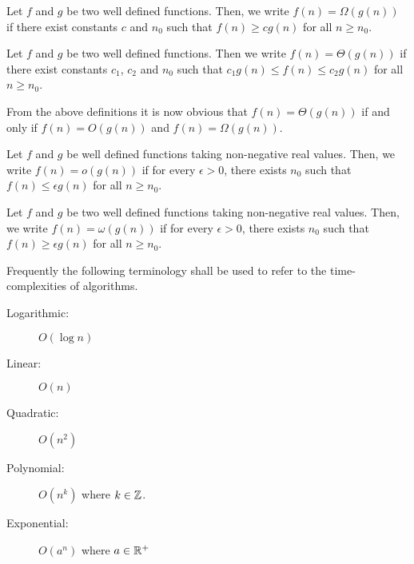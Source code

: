 	\begin{definition}
		Let $f$ and $g$ be two well defined functions. Then, we write $f(n) = \Omega(g(n))$ if there exist constants $c$ and $n_0$ such that $f(n)\ge cg(n)$ for all $n\ge n_0$.
	\end{definition}
	\begin{definition}
		Let $f$ and $g$ be two well defined functions. Then we write $f(n) = \Theta(g(n))$ if there exist constants $c_1$, $c_2$ and $n_0$ such that $c_1g(n)\le f(n)\le c_2g(n)$ for all $n\ge n_0$.
	\end{definition}
	From the above definitions it is now obvious that $f(n) = \Theta(g(n))$ if and only if $f(n) = O(g(n))$ and $f(n) = \Omega(g(n))$.

	\begin{definition}
		Let $f$ and $g$ be well defined functions taking non-negative real values. Then, we write $f(n) = o(g(n))$ if for every $\epsilon>0$, there exists $n_0$ such that $f(n)\le\epsilon g(n)$ for all $n\ge n_0$.
	\end{definition}
	
	\begin{definition}
		Let $f$ and $g$ be two well defined functions taking non-negative real values. Then, we write $f(n) = \omega(g(n))$ if for every $\epsilon>0$, there exists $n_0$ such that $f(n)\ge\epsilon g(n)$ for all $n\ge n_0$.
	\end{definition}

	Frequently the following terminology shall be used to refer to the time-complexities of algorithms.
	\begin{description}
		\item[Logarithmic:] $O(\log n)$
		\item[Linear:] $O(n)$
		\item[Quadratic:] $O(n^2)$
		\item[Polynomial:] $O(n^k)$ where $k\in\mathbb{Z}$.
		\item[Exponential:] $O(a^n)$ where $a\in\mathbb{R}^+$ 
	\end{description}